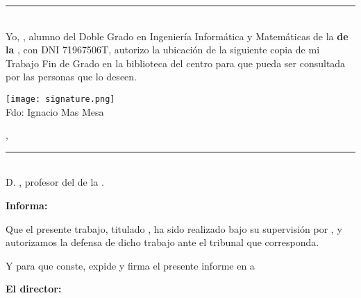 \documentclass['../proyecto.tex']{memoir}
\begin{document}
\thispagestyle{empty}

\noindent\rule[-1ex]{\textwidth}{2pt}\\[4.5ex]

Yo, \textbf{\AuthorName}, alumno del Doble Grado en
Ingeniería Informática y Matemáticas de la \textbf{\FacultyOne de la
  \University}, con DNI 71967506T, autorizo la ubicación de
la siguiente copia de mi Trabajo Fin de Grado en la biblioteca del
centro para que pueda ser consultada por las personas que lo deseen.

\vspace{6cm}

\texttt{[image: signature.png]} \\
\noindent Fdo: Ignacio Mas Mesa

\vspace{2cm}

\begin{flushright}
  \Location, \Time
\end{flushright}

\newpage

\thispagestyle{empty}

\noindent\rule[-1ex]{\textwidth}{2pt}\\[4.5ex]

D. \textbf{\MainProf}, profesor del
\Department de la \University.

\vspace{0.5cm}

\textbf{Informa:}

\vspace{0.5cm}

Que el presente trabajo, titulado \textit{\textbf{\ProjectTitle}}, ha
sido realizado bajo su supervisión por \textbf{\AuthorName}, y
autorizamos la defensa de dicho trabajo ante el tribunal que
corresponda.

\vspace{0.5cm}

Y para que conste, expide y firma el presente informe en \Location a \Time

\vspace{1cm}

\textbf{El director:}

\vspace{5cm}

\begin{minipage}{0.45\linewidth}
  \begin{center}
    \textbf{\MainProf}
  \end{center}
\end{minipage}
\end{document}
